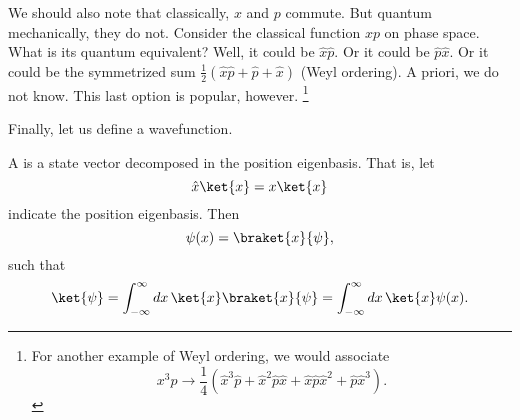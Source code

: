 We should also note that classically, $x$ and $p$ commute. But quantum mechanically, they do not. Consider the classical function $xp$ on phase space. What is its quantum equivalent? Well, it could be $\hat x \hat p$. Or it could be $\hat p \hat x$. Or it could be the symmetrized sum $\frac{1}{2}(\hat x \hat p +\hat p + \hat x)$ (Weyl ordering). A priori, we do not know. This last option is popular, however.%
    \footnote{For another example of Weyl ordering, we would associate
    \begin{equation*}
        x^3 p \to \frac{1}{4}(\hat x^3 \hat p + \hat x^2 \hat p \hat x + \hat x \hat p \hat x^2 + \hat p \hat x^3).
    \end{equation*}
    }

Finally, let us define a wavefunction.
\begin{defn}
    A  is a state vector decomposed in the position eigenbasis. That is, let
    \begin{equation}
        \hat x\ket{x} = x\ket{x}
    \end{equation}
    indicate the position eigenbasis. Then
    \begin{equation}
        \psi(x)=\braket{x}{\psi},
    \end{equation}
    such that
    \begin{equation}
        \ket{\psi} = \int_{-\infty}^\infty dx\, \ket{x}\braket{x}{\psi} = \int_{-\infty}^\infty dx\, \ket{x} \psi(x).
    \end{equation}
\end{defn}